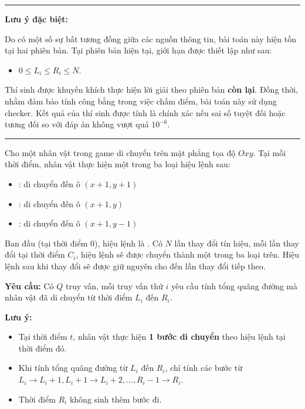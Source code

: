 
\begin{center}
    \begin{minipage}{\textwidth}
        \hrule
        \vspace{0.25cm}
        \noindent \textbf{Lưu ý đặc biệt:}
        
        Do có một số sự bất tương đồng giữa các nguồn thông tin, bài toán này hiện tồn tại hai phiên bản. Tại phiên bản hiện tại, giới hạn được thiết lập như sau:
        \begin{itemize}
            \item $0 \le L_i \le R_i \le N$.
        \end{itemize}
        
        \noindent Thí sinh được khuyến khích thực hiện lời giải theo phiên bản \textbf{còn lại}. Đồng thời, nhằm đảm bảo tính công bằng trong việc chấm điểm, bài toán này sử dụng checker. Kết quả của thí sinh được tính là chính xác nếu sai số tuyệt đối hoặc tương đối so với đáp án không vượt quá $10^{-6}$.
        \vspace{0.25cm}
        \hrule
    \end{minipage}
\end{center}

Cho một nhân vật trong game di chuyển trên mặt phẳng tọa độ $Oxy$. Tại mỗi thời điểm, nhân vật thực hiện một trong ba loại hiệu lệnh sau:
\begin{itemize}
    \item \fbox{\texttt{/}} : di chuyển đến ô $(x+1, y+1)$
    \item \fbox{\texttt{-}} : di chuyển đến ô $(x+1, y)$
    \item \fbox{\texttt{\textbackslash}} : di chuyển đến ô $(x+1, y-1)$
\end{itemize}

Ban đầu (tại thời điểm $0$), hiệu lệnh là \fbox{\texttt{-}}. Có $N$ lần thay đổi tín hiệu, mỗi lần thay đổi tại thời điểm $C_i$, hiệu lệnh sẽ được chuyển thành một trong ba loại trên. Hiệu lệnh sau khi thay đổi sẽ được giữ nguyên cho đến lần thay đổi tiếp theo.

\medskip
\textbf{Yêu cầu:} Có $Q$ truy vấn, mỗi truy vấn thứ $i$ yêu cầu tính tổng quãng đường mà nhân vật đã di chuyển từ thời điểm $L_i$ đến $R_i$.

\bigskip
\textbf{Lưu ý:}
\begin{itemize}
    \item Tại thời điểm $t$, nhân vật thực hiện \textbf{1 bước di chuyển} theo hiệu lệnh tại thời điểm đó.  
    \item Khi tính tổng quãng đường từ $L_i$ đến $R_i$, chỉ tính các bước từ $L_i \to L_i+1, L_i+1 \to L_i+2, \dots, R_i-1 \to R_i$.  
    \item Thời điểm $R_i$ không sinh thêm bước đi.
\end{itemize}

